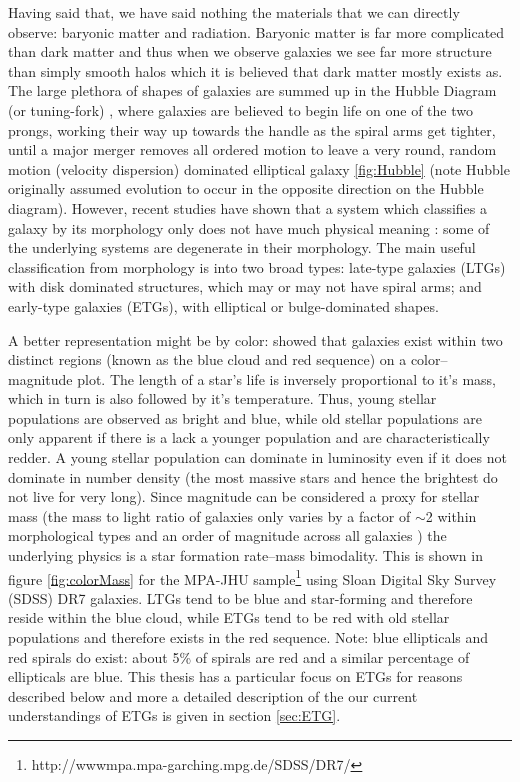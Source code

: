 Having said that, we have said nothing the materials that we can directly observe: baryonic matter and radiation. Baryonic matter is far more complicated than dark matter and thus when we observe galaxies we see far more structure than simply smooth halos which it is believed that dark matter mostly exists as. The large plethora of shapes of galaxies are summed up in the Hubble Diagram (or tuning-fork) \cite{Hubble1982, deVaucouleurs1959}, where galaxies are believed to begin life on one of the two prongs, working their way up towards the handle as the spiral arms get tighter, until a major merger removes all ordered motion to leave a very round, random motion (velocity dispersion) dominated elliptical galaxy \ref{fig:Hubble} (note Hubble originally assumed evolution to occur in the opposite direction on the Hubble diagram). However, recent studies have shown that a system which classifies a galaxy by its morphology only does not have much physical meaning \citep{Cappellari2011, Sanchez2011, Arnold2013, Bryant2014}: some of the underlying systems are degenerate in their morphology. The main useful classification from morphology is into two broad types: late-type galaxies (LTGs) with disk dominated structures, which may or may not have spiral arms; and early-type galaxies (ETGs), with elliptical or bulge-dominated shapes. 

A better representation might be by color: \citet{Baldry2004} showed that galaxies exist within two distinct regions (known as the blue cloud and red sequence) on a color--magnitude plot. The length of a star's life is inversely proportional to it's mass, which in turn is also followed by it's temperature. Thus, young stellar populations are observed as bright and blue, while old stellar populations are only apparent if there is a lack a younger population and are characteristically redder. A young stellar population can dominate in luminosity even if it does not dominate in number density (the most massive stars and hence the brightest do not live for very long). Since magnitude can be considered a proxy for stellar mass (the mass to light ratio of galaxies only varies by a factor of $\sim$2 within morphological types and an order of magnitude across all galaxies \citep{Faber1979}) the underlying physics is a star formation rate--mass bimodality. This is shown in figure \ref{fig:colorMass} for the MPA-JHU sample\footnote{http://wwwmpa.mpa-garching.mpg.de/SDSS/DR7/} using Sloan Digital Sky Survey (SDSS) DR7 galaxies. LTGs tend to be blue and star-forming and therefore reside within the blue cloud, while ETGs tend to be red with old stellar populations and therefore exists in the red sequence. Note: blue ellipticals and red spirals do exist: about 5\% of spirals are red \citep{Masters2010} and a similar percentage of ellipticals are blue. This thesis has a particular focus on ETGs for reasons described below and more a detailed description of the our current understandings of ETGs is given in section \ref{sec:ETG}. 

